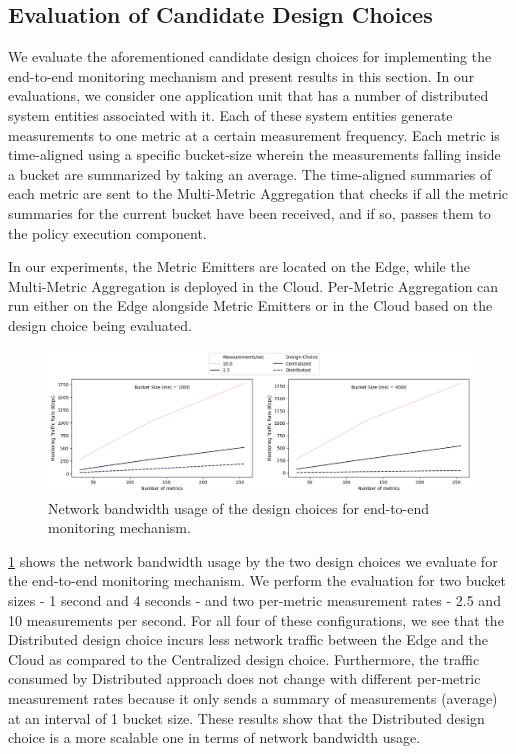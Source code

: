 \subsection{Evaluation of Candidate Design Choices}
We evaluate the aforementioned candidate design choices for implementing the end-to-end monitoring mechanism and present results in this section. In our evaluations, we consider one application unit that has a number of distributed system entities associated with it. Each of these system entities generate measurements to one metric at a certain measurement frequency. Each metric is time-aligned using a specific bucket-size wherein the measurements falling inside a bucket are summarized by taking an average. The time-aligned summaries of each metric are sent to the Multi-Metric Aggregation that checks if all the metric summaries for the current bucket have been received, and if so, passes them to the policy execution component. 
\par In our experiments, the Metric Emitters are located on the Edge, while the Multi-Metric Aggregation is deployed in the Cloud. Per-Metric Aggregation can run either on the Edge alongside Metric Emitters or in the Cloud based on the design choice being evaluated. 

\begin{figure}
\centering
\includegraphics[width=\linewidth]{figures/design_space/monitoring/nw_usage.png}
\caption{Network bandwidth usage of the design choices for end-to-end monitoring mechanism.}
\label{fig:monitoring_nw_usage}
\end{figure}
\cref{fig:monitoring_nw_usage} shows the network bandwidth usage by the two design choices we evaluate for the end-to-end monitoring mechanism. We perform the evaluation for two bucket sizes - 1 second and 4 seconds - and two per-metric measurement rates - 2.5 and 10 measurements per second. For all four of these configurations, we see that the Distributed design choice incurs less network traffic between the Edge and the Cloud as compared to the Centralized design choice. Furthermore, the traffic consumed by Distributed approach does not change with different per-metric measurement rates because it only sends a summary of measurements (average) at an interval of 1 bucket size. These results show that the Distributed design choice is a more scalable one in terms of network bandwidth usage.


